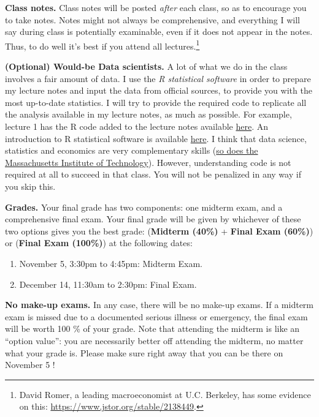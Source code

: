 \documentclass[]{book}
\providecommand{\tightlist}{%
  \setlength{\itemsep}{0pt}\setlength{\parskip}{0pt}}
\let\rmarkdownfootnote\footnote%
\def\footnote{\protect\rmarkdownfootnote}
\theoremstyle{definition}
\theoremstyle{definition}
\theoremstyle{definition}
\theoremstyle{remark}
\begin{document}
\textbf{Class notes.} Class notes will be posted \emph{after} each
class, so as to encourage you to take notes. Notes might not always be
comprehensive, and everything I will say during class is potentially
examinable, even if it does not appear in the notes. Thus, to do well
it's best if you attend all lectures.\footnote{David Romer, a leading
  macroeconomist at U.C. Berkeley, has some evidence on this:
  \url{https://www.jstor.org/stable/2138449}.}

\textbf{(Optional) Would-be Data scientists.} A lot of what we do in the
class involves a fair amount of data. I use the \emph{R statistical
software} in order to prepare my lecture notes and input the data from
official sources, to provide you with the most up-to-date statistics. I
will try to provide the required code to replicate all the analysis
available in my lecture notes, as much as possible. For example, lecture
1 has the R code added to the lecture notes available
\href{https://fgeerolf.github.io/teaching/ECON102/lecture1-R.pdf}{here}.
An introduction to R statistical software is available
\href{https://fgeerolf.github.io/teaching/ECON102/R-intro.pdf}{here}. I
think that data science, statistics and economics are very complementary
skills
(\href{https://www.eecs.mit.edu/academics-admissions/undergraduate-programs/6-14-computer-science-economics-and-data-science}{so
does the Massachusetts Institute of Technology}). However, understanding
code is not required at all to succeed in that class. You will not be
penalized in any way if you skip this.

\textbf{Grades.} Your final grade has two components: one midterm exam,
and a comprehensive final exam. Your final grade will be given by
whichever of these two options gives you the best grade:
(\textbf{Midterm (40\%)} + \textbf{Final Exam (60\%)}) or (\textbf{Final
Exam (100\%)}) at the following dates:

\begin{enumerate}
\def\labelenumi{\arabic{enumi}.}
\tightlist
\item
  November 5, 3:30pm to 4:45pm: Midterm Exam.
\item
  December 14, 11:30am to 2:30pm: Final Exam.
\end{enumerate}

\textbf{No make-up exams.} In any case, there will be no make-up exams.
If a midterm exam is missed due to a documented serious illness or
emergency, the final exam will be worth 100 \% of your grade. Note that
attending the midterm is like an ``option value'': you are necessarily
better off attending the midterm, no matter what your grade is. Please
make sure right away that you can be there on November 5 !
\end{document}
